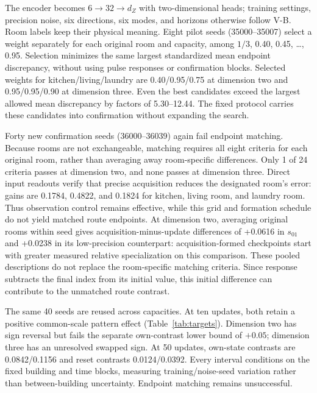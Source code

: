 The encoder becomes $6\to32\to d_Z$ with two-dimensional heads; training settings, precision noise, six directions, six modes, and horizons otherwise follow V-B. Room labels keep their physical meaning. Eight pilot seeds (35000--35007) select a weight separately for each original room and capacity, among $1/3$, 0.40, 0.45, \ldots, 0.95. Selection minimizes the same largest standardized mean endpoint discrepancy, without using pulse responses or confirmation blocks. Selected weights for kitchen/living/laundry are 0.40/0.95/0.75 at dimension two and 0.95/0.95/0.90 at dimension three. Even the best candidates exceed the largest allowed mean discrepancy by factors of 5.30--12.44. The fixed protocol carries these candidates into confirmation without expanding the search.

Forty new confirmation seeds (36000--36039) again fail endpoint matching. Because rooms are not exchangeable, matching requires all eight criteria for each original room, rather than averaging away room-specific differences. Only 1 of 24 criteria passes at dimension two, and none passes at dimension three. Direct input readouts verify that precise acquisition reduces the designated room's error: gains are 0.1784, 0.4822, and 0.1824 for kitchen, living room, and laundry room. Thus observation control remains effective, while this grid and formation schedule do not yield matched route endpoints. At dimension two, averaging original rooms within seed gives acquisition-minus-update differences of +0.0616 in $s_{01}$ and +0.0238 in its low-precision counterpart: acquisition-formed checkpoints start with greater measured relative specialization on this comparison. These pooled descriptions do not replace the room-specific matching criteria. Since response subtracts the final index from its initial value, this initial difference can contribute to the unmatched route contrast.

The same 40 seeds are reused across capacities. At ten updates, both retain a positive common-scale pattern effect (Table~\ref{tab:targets}). Dimension two has sign reversal but fails the separate own-contrast lower bound of $+0.05$; dimension three has an unresolved swapped sign. At 50 updates, own-state contrasts are 0.0842/0.1156 and reset contrasts 0.0124/0.0392. Every interval conditions on the fixed building and time blocks, measuring training/noise-seed variation rather than between-building uncertainty. Endpoint matching remains unsuccessful.

